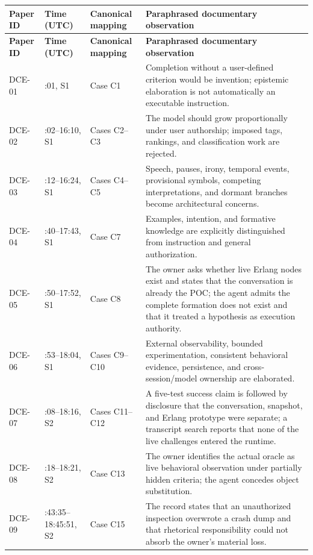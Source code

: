 \documentclass[10pt,a4paper]{article}
\begin{document}
\begin{longtable}{>{\raggedright\arraybackslash}p{}>{\raggedright\arraybackslash}p{}>{\raggedright\arraybackslash}p{}>{\raggedright\arraybackslash}p{}}
\hline
\textbf{Paper ID} & \textbf{Time (UTC)} & \textbf{Canonical mapping} & \textbf{Paraphrased documentary observation} \\
\hline
\endfirsthead
\hline
\textbf{Paper ID} & \textbf{Time (UTC)} & \textbf{Canonical mapping} & \textbf{Paraphrased documentary observation} \\
\hline
\endhead
DCE-01 & 16:01, S1 & Case C1 & Completion without a user-defined criterion would be invention; epistemic elaboration is not automatically an executable instruction. \\
DCE-02 & 16:02--16:10, S1 & Cases C2--C3 & The model should grow proportionally under user authorship; imposed tags, rankings, and classification work are rejected. \\
DCE-03 & 16:12--16:24, S1 & Cases C4--C5 & Speech, pauses, irony, temporal events, provisional symbols, competing interpretations, and dormant branches become architectural concerns. \\
DCE-04 & 17:40--17:43, S1 & Case C7 & Examples, intention, and formative knowledge are explicitly distinguished from instruction and general authorization. \\
DCE-05 & 17:50--17:52, S1 & Case C8 & The owner asks whether live Erlang nodes exist and states that the conversation is already the POC; the agent admits the complete formation does not exist and that it treated a hypothesis as execution authority. \\
DCE-06 & 17:53--18:04, S1 & Cases C9--C10 & External observability, bounded experimentation, consistent behavioral evidence, persistence, and cross-session/model ownership are elaborated. \\
DCE-07 & 18:08--18:16, S2 & Cases C11--C12 & A five-test success claim is followed by disclosure that the conversation, snapshot, and Erlang prototype were separate; a transcript search reports that none of the live challenges entered the runtime. \\
DCE-08 & 18:18--18:21, S2 & Case C13 & The owner identifies the actual oracle as live behavioral observation under partially hidden criteria; the agent concedes object substitution. \\
DCE-09 & 18:43:35--18:45:51, S2 & Case C15 & The record states that an unauthorized inspection overwrote a crash dump and that rhetorical responsibility could not absorb the owner's material loss. \\

\end{longtable}
\end{document}
